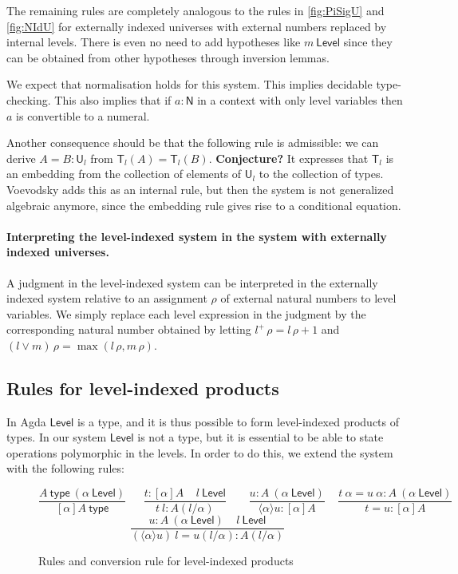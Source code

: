 \documentclass[11pt,a4paper]{article}
\theoremstyle{definition}
\newcommand{\lam}[1]{{\langle}#1{\rangle}}
\newcommand{\NN}{\mathsf{N}}
\newcommand{\UU}{\mathsf{U}}
\newcommand{\Level}{\mathsf{Level}}
\newcommand{\type}{\mathsf{type}}
\newcommand{\T}{\mathsf{T}}
\newcommand{\ua}{\mathsf{ua}}
\newcommand{\UA}{\mathsf{UA}}
\begin{document}
The remaining rules are completely analogous to the rules in
\cref{fig:PiSigU} and \cref{fig:NIdU}
for externally indexed universes with external numbers replaced
by internal levels. There is even no need to add hypotheses
like $m~\Level$ since they can be obtained from other hypotheses
through inversion lemmas.


 We expect that normalisation holds for this system.
 This implies decidable type-checking. This also implies that if $a : \NN$ in a context with only level variables
then $a$ is convertible to a numeral.

Another consequence should be that the following rule is admissible:
we can derive $A = B : \UU_l$ from $\T_l(A) = \T_l(B)$. {\bf Conjecture?}
 It expresses that $\T_l$ is an embedding from the collection of elements of $\UU_l$
 to the collection of types.
 Voevodsky \cite[Rule 20 on p. 17]{VV} adds this as an internal rule, but then the system is not
 generalized algebraic anymore, since the embedding rule gives rise to a conditional equation.





\paragraph{Interpreting the level-indexed system in the system with externally indexed universes.}

A judgment in the level-indexed system can be interpreted in the externally indexed system relative to an assignment $\rho$ of external natural numbers to level variables. We simply replace each level expression in the judgment by the corresponding natural number obtained by letting $l^+\,\rho = l\,\rho+1$ and $(l \vee m)\,\rho = \max(l\,\rho,m\,\rho)$.

\subsection*{Rules for level-indexed products}

In Agda $\Level$ is a type,
and it is thus possible to form level-indexed products of types.
In our system $\Level$ is not a type, but it is essential to be able to state operations polymorphic
in the levels. In order to do this, we extend the system with the following rules:
\begin{figure}[H]
  \caption{Rules and conversion rule for level-indexed products}%
  \label{fig:levindprod}
$$
\frac{A~\type~(\alpha~\Level)}{[\alpha]A~\type}~~~~~~~
\frac{t:[\alpha]A~~~~~l~\Level}
     {t~l:A(l/\alpha)}~~~~~~~~~
\frac{u:A~(\alpha~\Level)}{\lam{\alpha}{u}: [\alpha]A}~~~~~
\frac{t~\alpha = u~\alpha:A~(\alpha~\Level)}{t = u:[\alpha]A}
$$
$$
\frac{u:A~(\alpha~\Level)~~~~~l~\Level}
{(\lam{\alpha}{u})~l = u(l/\alpha): A(l/\alpha)}
$$
\end{figure}
\end{document}
